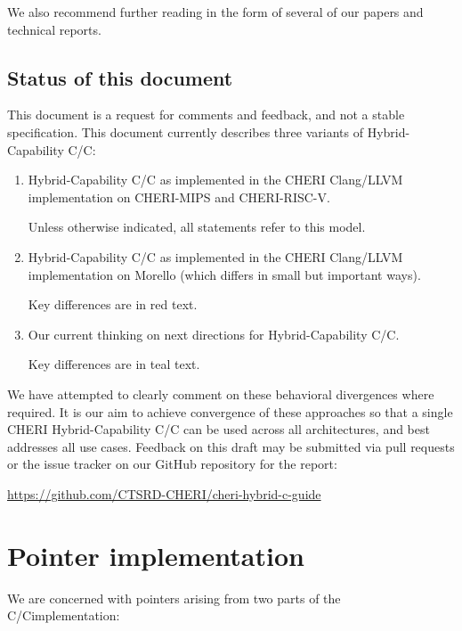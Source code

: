 \documentclass[12pt,twoside,openright,a4paper]{article}
\newcommand{\futurevariant}[1]{{\color{teal} #1}}
\newcommand{\morellovariant}[1]{{\color{red} #1}}
\newcommand*{\cpp}{\texorpdfstring{C\textsmaller[2]{\protect\nolinebreak[4]\hspace{-.05em}\raisebox{.45ex}{\textbf{++}}}}{C++}}
\newcommand*{\COrCpp}{C/\cpp{}}
\newcommand*{\hybridCOrCpp}{Hybrid-Capability \COrCpp{}}
\newcommand*{\CHERIhybridCOrCpp}{CHERI \hybridCOrCpp{}}
\begin{document}
\noindent
We also recommend further reading in the form of several of our papers and
technical reports.

\subsection{Status of this document}

This document is a request for comments and feedback, and not a stable
specification.
This document currently describes three variants of \hybridCOrCpp{}:

\begin{enumerate}
\item \hybridCOrCpp{} as implemented in the CHERI Clang/LLVM implementation on
  CHERI-MIPS and CHERI-RISC-V.

  Unless otherwise indicated, all statements refer to this model.

\item \hybridCOrCpp{} as implemented in the CHERI Clang/LLVM implementation on
  Morello (which differs in small but important ways).

  Key differences are in \morellovariant{red text}.

\item Our current thinking on next directions for \hybridCOrCpp{}.

  Key differences are in \futurevariant{teal text}.
\end{enumerate}

\noindent
We have attempted to clearly comment on these behavioral divergences where
required.
It is our aim to achieve convergence of these approaches so that a single
\CHERIhybridCOrCpp{} can be used across all architectures, and best addresses
all use cases.
Feedback on this draft may be submitted via pull requests or the issue tracker
on our GitHub repository for the report:

\smallskip

\url{https://github.com/CTSRD-CHERI/cheri-hybrid-c-guide}

\section{Pointer implementation}

We are concerned with pointers arising from two parts of the \COrCpp implementation:
\end{document}
